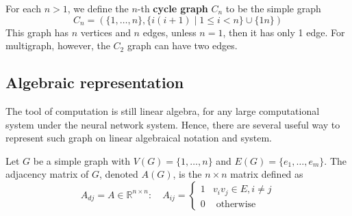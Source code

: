 \begin{definition}
    For each $n>1$, we define the $n$-th \textbf{cycle graph} $C_n$ to be the simple graph \begin{equation}
        C_n = (\{1,\dots,n\}, \{ i(i+1) \mid 1 \leq i < n \} \cup \{1n\} )
    \end{equation}
    This graph has $n$ vertices and $n$ edges, unless $n=1$, then it has only 1 edge. For multigraph, however, the $C_2$ graph can have two edges. 
\end{definition}


\subsection{Algebraic representation}
The tool of computation is still linear algebra, for any large computational system under the neural network system. Hence, there are several useful way to represent such graph on linear algebraical notation and system. 
\begin{definition}
    Let $G$ be a simple graph with $V(G)=\{1,\dots,n\}$ and $E(G)= \{e_1, \dots, e_m\}$. The adjacency matrix of $G$, denoted $A(G)$, is the $n\times n$ matrix defined as \begin{equation}
        A_{dj} = A \in \mathbb{R}^{n\times n}: \quad A_{ij} = \begin{cases}
            1 & v_i v_j \in E, i \neq j \\
            0 & \text{ otherwise}
        \end{cases}
    \end{equation}
\end{definition}

